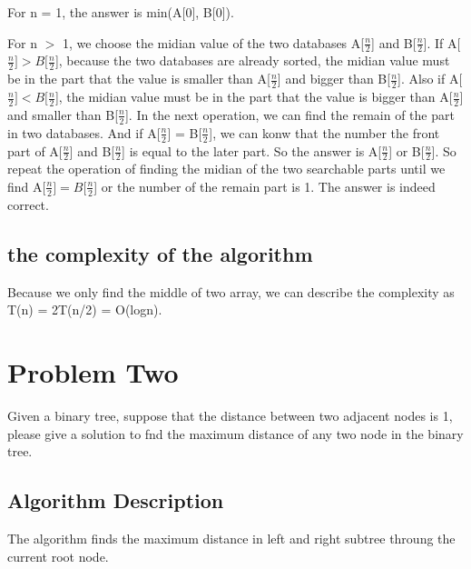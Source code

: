 \documentclass{article}
\begin{document}
For n = 1, the answer is min(A[0], B[0]).

For n $>$ 1, we choose the midian value of the two databases A[$\frac{n}{2}$] and B[$\frac{n}{2}$]. If A[$\frac{n}{2}] > B[\frac{n}{2}$], because the two databases are already sorted, the midian value must be in the part that the value is smaller than A[$\frac{n}{2}$] and bigger than B[$\frac{n}{2}$]. Also if A[$\frac{n}{2}] < B[\frac{n}{2}$], the midian value must be in the part that the value is bigger than A[$\frac{n}{2}$] and smaller than B[$\frac{n}{2}$]. In the next operation, we can find the remain of the part in two databases. And if A[$\frac{n}{2}$] = B[$\frac{n}{2}$], we can konw that the number the front part of A[$\frac{n}{2}$] and B[$\frac{n}{2}$] is equal to the later part. So the answer is A[$\frac{n}{2}$] or B[$\frac{n}{2}$]. So repeat the operation of finding the midian of the two searchable parts until we find A[$\frac{n}{2}] = B[\frac{n}{2}$] or the number of the remain part is 1. The answer is indeed correct.





\subsection{the complexity of the algorithm}

Because we only find the middle of two array, we can describe the complexity as T(n) = 2T(n/2) = O(logn).

\newpage
\section{Problem Two}

Given a binary tree, suppose that the distance between two adjacent nodes is 1, please give a solution to fnd the maximum distance of any two node in the binary tree.

\subsection{Algorithm Description}

The algorithm finds the maximum distance in left and right subtree throung the current root node.
\end{document}
